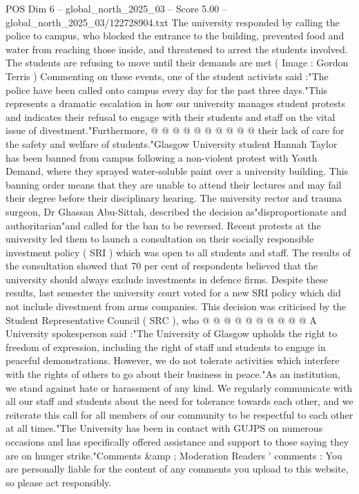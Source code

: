\begin{textsample}{POS Dim 6 – global\_north\_2025\_03 – Score 5.00 – global\_north\_2025\_03/122728904.txt}
The university responded by calling the police to campus, who blocked the entrance to the building, prevented food and water from reaching those inside, and threatened to arrest the students involved.
The students are refusing to move until their demands are met ( Image : Gordon Terris ) Commenting on these events, one of the student activists said :"The police have been called onto campus every day for the past three days."This represents a dramatic escalation in how our university manages student protests and indicates their refusal to engage with their students and staff on the vital issue of divestment."Furthermore, @ @ @ @ @ @ @ @ @ @ their lack of care for the safety and welfare of students."Glasgow University student Hannah Taylor has been banned from campus following a non-violent protest with Youth Demand, where they sprayed water-soluble paint over a university building.
This banning order means that they are unable to attend their lectures and may fail their degree before their disciplinary hearing.
The university rector and trauma surgeon, Dr Ghassan Abu-Sittah, described the decision as"disproportionate and authoritarian"and called for the ban to be reversed.
Recent protests at the university led them to launch a consultation on their socially responsible investment policy ( SRI ) which was open to all students and staff.
The results of the consultation showed that 70 per cent of respondents believed that the university should always exclude investments in defence firms.
Despite these results, last semester the university court voted for a new SRI policy which did not include divestment from arms companies.
This decision was criticised by the Student Representative Council ( SRC ), who @ @ @ @ @ @ @ @ @ @ A University spokesperson said :"The University of Glasgow upholds the right to freedom of expression, including the right of staff and students to engage in peaceful demonstrations.
However, we do not tolerate activities which interfere with the rights of others to go about their business in peace."As an institution, we stand against hate or harassment of any kind.
We regularly communicate with all our staff and students about the need for tolerance towards each other, and we reiterate this call for all members of our community to be respectful to each other at all times."The University has been in contact with GUJPS on numerous occasions and has specifically offered assistance and support to those saying they are on hunger strike."Comments \&amp ; Moderation Readers ' comments : You are personally liable for the content of any comments you upload to this website, so please act responsibly.

\end{textsample}
